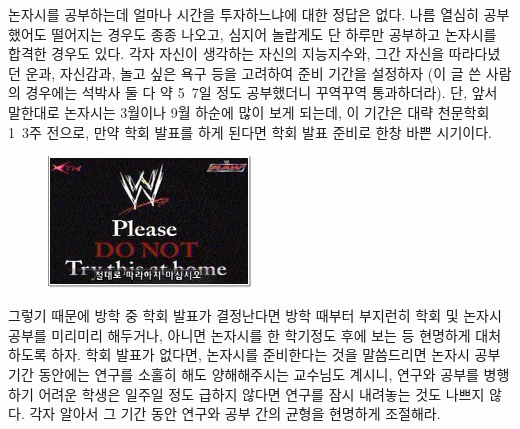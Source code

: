 논자시를 공부하는데 얼마나 시간을 투자하느냐에 대한 정답은 없다. 나름 열심히
공부했어도 떨어지는 경우도 종종 나오고, 심지어 놀랍게도 단 하루만 공부하고
논자시를 합격한 경우도 있다. 각자 자신이 생각하는 자신의 지능지수와, 그간 자신을
따라다녔던 운과, 자신감과, 놀고 싶은 욕구 등을 고려하여 준비 기간을 설정하자 (이
글 쓴 사람의 경우에는 석박사 둘 다 약 5~7일 정도 공부했더니 꾸역꾸역
통과하더라). 단, 앞서 말한대로 논자시는 3월이나 9월 하순에 많이 보게 되는데, 이
기간은 대략 천문학회 1~3주 전으로, 만약 학회 발표를 하게 된다면 학회 발표 준비로
한창 바쁜 시기이다.
\begin{figure}
  \vspace{-20pt}
  \begin{center}
    \includegraphics[width=0.48\textwidth]{./Figures/do_not_try_this_home.png}
  \end{center}
  \vspace{-20pt}
  \vspace{-10pt}
\end{figure}
그렇기 때문에 방학 중 학회 발표가 결정난다면 방학 때부터 부지런히 학회 및 논자시
공부를 미리미리 해두거나, 아니면 논자시를 한 학기정도 후에 보는 등 현명하게
대처하도록 하자. 학회 발표가 없다면, 논자시를 준비한다는 것을 말씀드리면 논자시
공부 기간 동안에는 연구를 소홀히 해도 양해해주시는 교수님도 계시니, 연구와 공부를
병행하기 어려운 학생은 일주일 정도 급하지 않다면 연구를 잠시 내려놓는 것도 나쁘지
않다. 각자 알아서 그 기간 동안 연구와 공부 간의 균형을 현명하게 조절해라.

